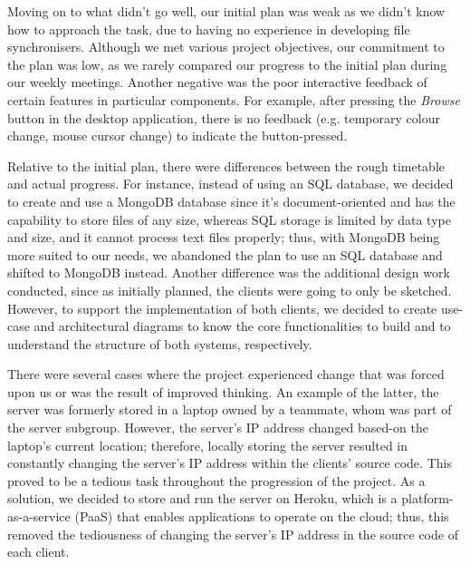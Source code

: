 \documentclass{article}
\begin{document}
\noindent Moving on to what didn't go well, our initial plan was weak as we didn't know how to approach the task, due to having no experience in developing file synchronisers. Although we met various project objectives, our commitment to the plan was low, as we rarely compared our progress to the initial plan during our weekly meetings. Another negative was the poor interactive feedback of certain features in particular components. For example, after pressing the \textit{Browse} button in the desktop application, there is no feedback (e.g. temporary colour change, mouse cursor change) to indicate the button-pressed.

\noindent Relative to the initial plan, there were differences between the rough timetable and actual progress. For instance, instead of using an SQL database, we decided to create and use a MongoDB database since it's document-oriented and has the capability to store files of any size, whereas SQL storage is limited by data type and size, and it cannot process text files properly; thus, with MongoDB being more suited to our needs, we abandoned the plan to use an SQL database and shifted to MongoDB instead. Another difference was the additional design work conducted, since as initially planned, the clients were going to only be sketched. However, to support the implementation of both clients, we decided to create use-case and architectural diagrams to know the core functionalities to build and to understand the structure of both systems, respectively.

\noindent There were several cases where the project experienced change that was forced upon us or was the result of improved thinking. An example of the latter, the server was formerly stored in a laptop owned by a teammate, whom was part of the server subgroup. However, the server's IP address changed based-on the laptop's current location; therefore, locally storing the server resulted in constantly changing the server's IP address within the clients' source code. This proved to be a tedious task throughout the progression of the project. As a solution, we decided to store and run the server on Heroku, which is a platform-as-a-service (PaaS) that enables applications to operate on the cloud; thus, this removed the tediousness of changing the server's IP address in the source code of each client.  
\end{document}
